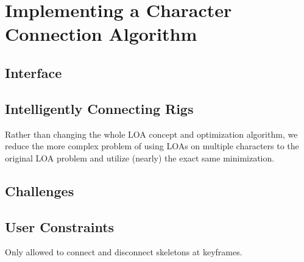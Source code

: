 \chapter{Implementing a Character Connection Algorithm}


\section{Interface}


\section{Intelligently Connecting Rigs}
Rather than changing the whole LOA concept and optimization algorithm, we reduce the more complex problem of using LOAs on multiple characters to the original LOA problem and utilize (nearly) the exact same minimization.

\section{Challenges}


\section{User Constraints}
Only allowed to connect and disconnect skeletons at keyframes.

